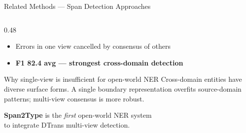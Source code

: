 \documentclass[aspectratio=169,10pt]{beamer}
\newcommand{\hg}[1]{\textcolor{dkgreen}{\textbf{#1}}}
\begin{document}
\begin{frame}{Related Methods — Span Detection Approaches}
\begin{columns}[T]
\begin{column}{0.48\textwidth}
\begin{itemize}
        \item Errors in one view cancelled by consensus of others
        \item \hg{F1 82.4 avg — strongest cross-domain detection}
      \end{itemize}
      \vspace{0.5em}
      \begin{block}{Why single-view is insufficient for open-world NER}
        Cross-domain entities have diverse surface forms. A single boundary representation overfits source-domain patterns; multi-view consensus is more robust.
      \end{block}
      \vspace{0.3em}
      \small\textbf{Span2Type} is the \emph{first} open-world NER system\\
      to integrate DTrans multi-view detection.
    \end{column}
  \end{columns}
\end{frame}
\end{document}

